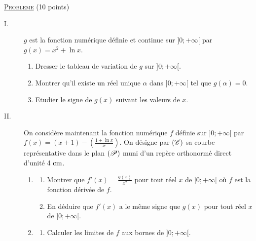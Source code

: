 \noindent \underline{\textsc{Probleme}} (10 points) 
      \begin{description}
            \item[I. ] $g$ est la fonction num\'erique d\'efinie et continue sur $]0;+\infty[$ par $g(x) = x^2 + \ln x$.
                  \begin{enumerate}
                        \item Dresser le tableau de variation de $g$ sur $]0;+\infty[$.
                        \item Montrer qu'il existe un r\'eel unique $\alpha$ dans $]0;+\infty[$ tel que $g(\alpha) = 0$.
                        \item Etudier le signe de $g(x)$ suivant les valeurs de $x$.
                  \end{enumerate}
            \item[II. ]
                  On consid\`ere maintenant la fonction num\'erique $f$ d\'efinie sur $]0;+\infty[$ par 
                  $
                        f(x) = (x+1) - \left( \frac{1+\ln x}{x} \right) .
                  $
                  On d\'esigne par $(\mathscr{C})$ sa courbe repr\'esentative dans le plan $(\mathscr{P})$ muni d'un rep\`ere orthonorm\'e
                  direct \Oij{} d'unit\'e $4~\mathrm{cm}$.
                  \begin{enumerate}
                        \item \begin{enumerate}
                                    \item Montrer que $f'(x) = \frac{g(x)}{x^2}$ pour tout r\'eel $x$ de $]0;+\infty[$
                                          o\`u $f$ est la fonction d\'eriv\'ee de $f$.
                                    \item En d\'eduire que $f'(x)$ a le m\^eme signe que $g(x)$ 
                                          pour tout r\'eel $x$ de $]0;+\infty[$.
                              \end{enumerate}
                        \item \begin{enumerate}
                                    \item Calculer les limites de $f$ aux bornes de $]0;+\infty[$.

\end{enumerate}
\end{enumerate}
\end{description}
